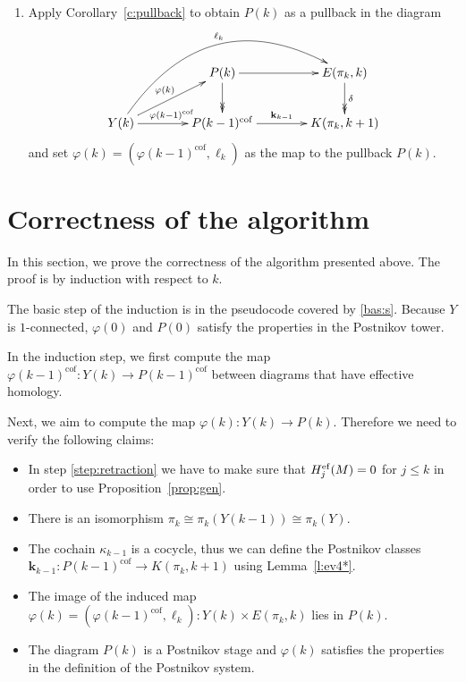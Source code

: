 \documentclass[12pt,a4wide]{article}
\theoremstyle{plain}
\theoremstyle{definition}
\newcommand{\cofr}{\mathrm{cof}}
\newcommand{\Pst}[1]{P(#1)}
\newcommand{\Yst}[1]{Y(#1)}
\newcommand{\towercompmap}[2]{#1(#2)}
\newcommand{\varphist}[1]{\towercompmap{\varphi}{#1}}
\newcommand{\thedimm}{{k}}
\newcommand{\thedimmm}{{j}}
\renewcommand\:{\colon}
\newcommand{\dY}{Y}
\newcommand{\dM}{M}
\newcommand{\dpi}{\pi}
\newcommand{\dK}{K}
\newcommand{\dE}{E}
\newcommand{\dH}{H}
\newcommand\cobo{\delta}
\newcommand\kkk{{\mathbf{k}}}
\begin{document}
\begin{enumerate}
\item\label{step:pullback}Apply Corollary~\ref{c:pullback} to obtain $\Pst{\thedimm}$ as a pullback in the diagram
\begin{equation}\label{eq:towerpullback}
\xymatrix@C=40pt{
{} & \Pst{\thedimm} \ar@{->>}[d] \ar[r] & \dE(\dpi_\thedimm,\thedimm) \ar@{->>}[d]^{\cobo} \\
\Yst{\thedimm} \ar[r]^{\varphist{\thedimm-1}^\cofr}  \ar@/^45pt/[urr]^{\ell_{\thedimm}} \ar[ur]^{\varphist{\thedimm}}& \Pst{\thedimm-1}^\cofr \ar[r]^-{\kkk_{\thedimm-1}} & \dK(\dpi_\thedimm,\thedimm+1)
} 
\end{equation}
and set $\varphist{\thedimm} = (\varphist{\thedimm -1}^\cofr,\ell_\thedimm)$ as the map to the pullback $\Pst{\thedimm}$.
\end{enumerate}
\section{Correctness of the algorithm}\label{sec:correctness}

In this section, we prove the correctness of the algorithm presented above. The proof is by induction with respect to $\thedimm$.

The basic step of the induction is in the pseudocode covered by \ref{bas:s}. Because $\dY$ is $1$-connected,   $\varphist{0}$ and $\Pst{0}$ satisfy the properties in the Postnikov tower.


In the induction step,  we first compute the map $\varphist{\thedimm-1}^\cofr\: \Yst{\thedimm} \to \Pst{\thedimm -1}^\cofr$ between diagrams that have effective homology.

Next, we aim to compute the map $\varphist{\thedimm}\: \Yst{\thedimm} \to \Pst{\thedimm}$. Therefore we need to verify the following claims:
\begin{itemize}
\item In step \ref{step:retraction} we have to make sure that $\dH^\ef _{j} (\dM) = 0$  for $\thedimmm\leq \thedimm$ in order to use Proposition~\ref{prop:gen}.
\item There is an isomorphism $\dpi_\thedimm\cong\dpi_\thedimm(\Yst{\thedimm-1}) \cong \dpi_\thedimm(\dY)$.
\item The cochain $\kappa_{\thedimm-1}$ is a cocycle, thus we can define the Postnikov classes  $\kkk_{\thedimm-1}\: \Pst{\thedimm-1}^\cofr \to \dK(\dpi_\thedimm, \thedimm +1)$ using Lemma~\ref{l:ev4*}.
\item The image of the induced map
$\varphist{\thedimm}=(\varphist{\thedimm-1}^\cofr,\ell_\thedimm)\: \Yst{\thedimm} \times \dE(\dpi_\thedimm, \thedimm)$ lies in $\Pst{\thedimm}$.
\item The diagram $\Pst{\thedimm}$ is a Postnikov stage and $\varphist{\thedimm}$ satisfies the properties in the definition of the Postnikov system.
\end{itemize}
\end{document}
